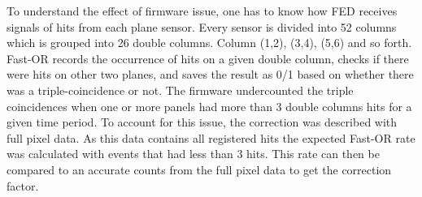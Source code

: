 
%

To understand the effect of firmware issue, one has to know how FED receives signals of hits from each plane sensor. Every sensor is divided into 52 columns which is grouped into 26 double columns. Column (1,2), (3,4), (5,6) and so forth. Fast-OR records the occurrence of hits on a given double column, checks if there were hits on other two planes, and saves the result as 0/1 based on whether there was a triple-coincidence or not. The firmware undercounted the triple coincidences when one or more panels had more than 3 double columns hits for a given time period. To account for this issue, the correction was described with full pixel data. As this data contains all registered hits the expected Fast-OR rate was calculated with events that had less than 3 hits. This rate can then be compared to an accurate counts from the full pixel data to get the correction factor.




